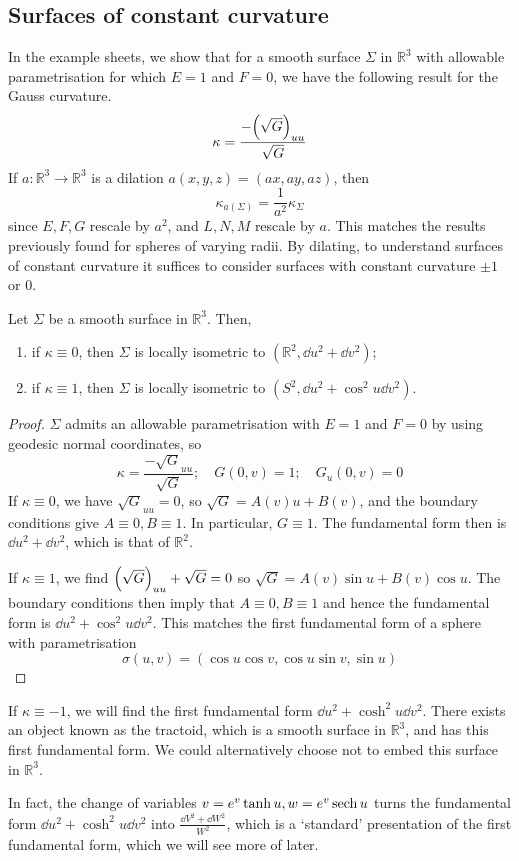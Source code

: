 \subsection{Surfaces of constant curvature}
In the example sheets, we show that for a smooth surface \( \Sigma \) in \( \mathbb R^3 \) with allowable parametrisation for which \( E = 1 \) and \( F = 0 \), we have the following result for the Gauss curvature.
\[ \kappa = \frac{-\qty(\sqrt{G})_{uu}}{\sqrt{G}} \]
If \( a \colon \mathbb R^3 \to \mathbb R^3 \) is a dilation \( a(x,y,z) = (ax,ay,az) \), then
\[ \kappa_{a(\Sigma)} = \frac{1}{a^2} \kappa_\Sigma \]
since \( E, F, G \) rescale by \( a^2 \), and \( L, N, M \) rescale by \( a \).
This matches the results previously found for spheres of varying radii.
By dilating, to understand surfaces of constant curvature it suffices to consider surfaces with constant curvature \( \pm 1 \) or 0.
\begin{proposition}
	Let \( \Sigma \) be a smooth surface in \( \mathbb R^3 \).
	Then,
	\begin{enumerate}
		\item if \( \kappa \equiv 0 \), then \( \Sigma \) is locally isometric to \( (\mathbb R^2, \dd{u^2} + \dd{v}^2) \);
		\item if \( \kappa \equiv 1 \), then \( \Sigma \) is locally isometric to \( (S^2, \dd{u}^2 + \cos^2 u \dd{v}^2) \).
	\end{enumerate}
\end{proposition}
\begin{proof}
	\( \Sigma \) admits an allowable parametrisation with \( E = 1 \) and \( F = 0 \) by using geodesic normal coordinates, so
	\[ \kappa = \frac{-\sqrt{G}_{uu}}{\sqrt{G}};\quad G(0,v) = 1;\quad G_u(0,v) = 0 \]
	If \( \kappa \equiv 0 \), we have \( \sqrt{G}_{uu} = 0 \), so \( \sqrt{G} = A(v) u + B(v) \), and the boundary conditions give \( A \equiv 0, B \equiv 1 \).
	In particular, \( G \equiv 1 \).
	The fundamental form then is \( \dd{u}^2 + \dd{v}^2 \), which is that of \( \mathbb R^2 \).

	If \( \kappa \equiv 1 \), we find \( \qty(\sqrt{G})_{uu} + \sqrt{G} = 0 \) so \( \sqrt{G} = A(v) \sin u + B(v) \cos u \).
	The boundary conditions then imply that \( A \equiv 0, B \equiv 1 \) and hence the fundamental form is \( \dd{u}^2 + \cos^2 u \dd{v}^2 \).
	This matches the first fundamental form of a sphere with parametrisation
	\[ \sigma(u,v) = (\cos u \cos v, \cos u \sin v, \sin u) \]
\end{proof}
\begin{remark}
	If \( \kappa \equiv -1 \), we will find the first fundamental form \( \dd{u}^2 + \cosh^2 u \dd{v}^2 \).
	There exists an object known as the tractoid, which is a smooth surface in \( \mathbb R^3 \), and has this first fundamental form.
	We could alternatively choose not to embed this surface in \( \mathbb R^3 \).

	In fact, the change of variables \( v = e^v \tanh u, w = e^v \sech u \) turns the fundamental form \( \dd{u}^2 + \cosh^2 u \dd{v}^2 \) into \( \frac{\dd{V}^2 + \dd{W}^2}{W^2} \), which is a `standard' presentation of the first fundamental form, which we will see more of later.
\end{remark}

